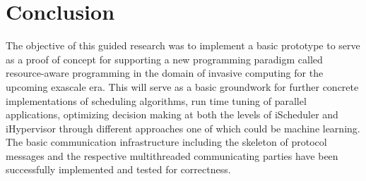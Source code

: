 \documentclass[a4paper, 12pt]{article}
\begin{document}
\section{Conclusion}
The objective of this guided research was to implement a basic prototype to serve as a proof of concept for supporting a new programming paradigm called resource-aware programming in the domain of invasive computing for the upcoming exascale era. This will serve as a basic groundwork for further concrete implementations of scheduling algorithms, run time tuning of parallel applications, optimizing decision making at both the levels of iScheduler and iHypervisor through different approaches one of which could be machine learning. The basic communication infrastructure including the skeleton of protocol messages and the respective multithreaded communicating parties have been successfully implemented and tested for correctness.



\end{document}
